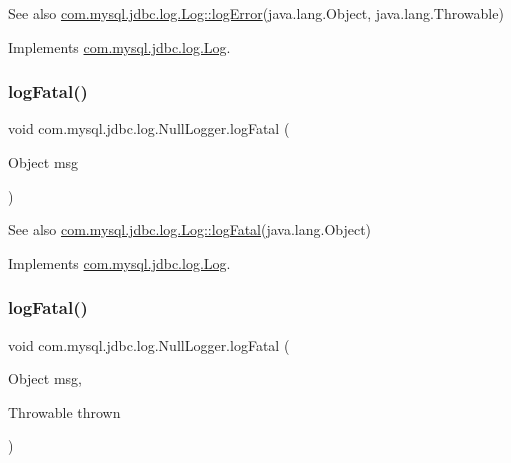 \begin{DoxySeeAlso}{See also}
\mbox{\hyperlink{interfacecom_1_1mysql_1_1jdbc_1_1log_1_1_log_aefe78baa37affef138eaba105b699022}{com.\+mysql.\+jdbc.\+log.\+Log\+::log\+Error}}(java.\+lang.\+Object, java.\+lang.\+Throwable) 
\end{DoxySeeAlso}


Implements \mbox{\hyperlink{interfacecom_1_1mysql_1_1jdbc_1_1log_1_1_log_abca2e1258e8b1bca83fd13066e8930cd}{com.\+mysql.\+jdbc.\+log.\+Log}}.

\mbox{\label{classcom_1_1mysql_1_1jdbc_1_1log_1_1_null_logger_affbd0fc8b13b06f765195be1de3b4535}} 
\subsubsection{\texorpdfstring{log\+Fatal()}{logFatal()}\hspace{0.1cm}{\footnotesize\ttfamily [1/2]}}
{\footnotesize\ttfamily void com.\+mysql.\+jdbc.\+log.\+Null\+Logger.\+log\+Fatal (\begin{DoxyParamCaption}\item[{Object}]{msg }\end{DoxyParamCaption})}

\begin{DoxySeeAlso}{See also}
\mbox{\hyperlink{interfacecom_1_1mysql_1_1jdbc_1_1log_1_1_log_a8d3b6b295ded6eaa1bfa50ffca6a4d28}{com.\+mysql.\+jdbc.\+log.\+Log\+::log\+Fatal}}(java.\+lang.\+Object) 
\end{DoxySeeAlso}


Implements \mbox{\hyperlink{interfacecom_1_1mysql_1_1jdbc_1_1log_1_1_log_a8d3b6b295ded6eaa1bfa50ffca6a4d28}{com.\+mysql.\+jdbc.\+log.\+Log}}.

\mbox{\label{classcom_1_1mysql_1_1jdbc_1_1log_1_1_null_logger_aefb06f46d91ee385eb925ef2659f591c}} 
\subsubsection{\texorpdfstring{log\+Fatal()}{logFatal()}\hspace{0.1cm}{\footnotesize\ttfamily [2/2]}}
{\footnotesize\ttfamily void com.\+mysql.\+jdbc.\+log.\+Null\+Logger.\+log\+Fatal (\begin{DoxyParamCaption}\item[{Object}]{msg,  }\item[{Throwable}]{thrown }\end{DoxyParamCaption})}

